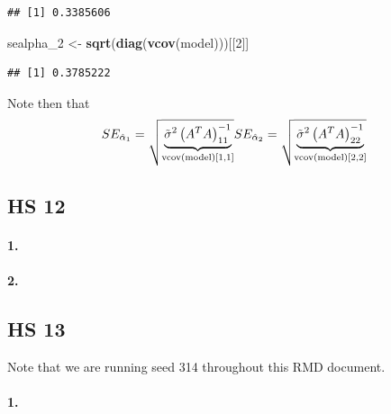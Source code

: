 \documentclass[
]{article}
\newenvironment{Shaded}{\begin{snugshade}}{\end{snugshade}}
\newcommand{\DecValTok}[1]{\textcolor[rgb]{0.00,0.00,0.81}{#1}}
\newcommand{\KeywordTok}[1]{\textcolor[rgb]{0.13,0.29,0.53}{\textbf{#1}}}
\newcommand{\NormalTok}[1]{#1}
\newcommand{\StringTok}[1]{\textcolor[rgb]{0.31,0.60,0.02}{#1}}
\begin{document}
\begin{verbatim}
## [1] 0.3385606
\end{verbatim}

\begin{Shaded}
\begin{Highlighting}[]
\NormalTok{sealpha_}\DecValTok{2}\NormalTok{ <-}\StringTok{ }\KeywordTok{sqrt}\NormalTok{(}\KeywordTok{diag}\NormalTok{(}\KeywordTok{vcov}\NormalTok{(model)))[[}\DecValTok{2}\NormalTok{]]}
\end{Highlighting}
\end{Shaded}

\begin{verbatim}
## [1] 0.3785222
\end{verbatim}

Note then that \[
SE_{\hat\alpha_1}=\sqrt{\underset{\text{vcov(model)[1,1]}}{\underbrace{\tilde\sigma^2\left({A^TA}\right)^{-1}_{11}}}}\\
SE_{\hat\alpha_2}=\sqrt{\underset{\text{vcov(model)[2,2]}}{\underbrace{\tilde\sigma^2\left({A^TA}\right)^{-1}_{22}}}}
\]

\hypertarget{hs-12}{%
\subsection{HS 12}\label{hs-12}}

\hypertarget{section-48}{%
\paragraph{\texorpdfstring{\textbf{1.}}{1.}}\label{section-48}}

\hypertarget{section-49}{%
\paragraph{\texorpdfstring{\textbf{2.}}{2.}}\label{section-49}}

\hypertarget{hs-13}{%
\subsection{HS 13}\label{hs-13}}

Note that we are running seed 314 throughout this RMD document.

\hypertarget{section-50}{%
\paragraph{\texorpdfstring{\textbf{1.}}{1.}}\label{section-50}}
\end{document}
